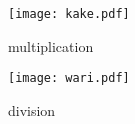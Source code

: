\documentclass[dvipdfmx]{article}
\begin{document}
\begin{figure}[htbp]
 \begin{minipage}{0.5\hsize}
  \begin{center}
   \texttt{[image: kake.pdf]}
  \end{center}
  \caption{multiplication}
  \label{fig:one}
 \end{minipage}
 \begin{minipage}{0.5\hsize}
  \begin{center}
   \texttt{[image: wari.pdf]}
  \end{center}
  \caption{division}
  \label{fig:two}
 \end{minipage}
\end{figure}
\end{document}
